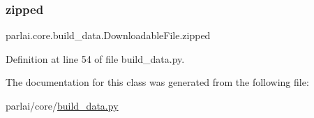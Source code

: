 \subsubsection{\texorpdfstring{zipped}{zipped}}
{\footnotesize\ttfamily parlai.\+core.\+build\+\_\+data.\+Downloadable\+File.\+zipped}



Definition at line 54 of file build\+\_\+data.\+py.



The documentation for this class was generated from the following file\+:\begin{DoxyCompactItemize}
\item 
parlai/core/\hyperlink{build__data_8py}{build\+\_\+data.\+py}\end{DoxyCompactItemize}
